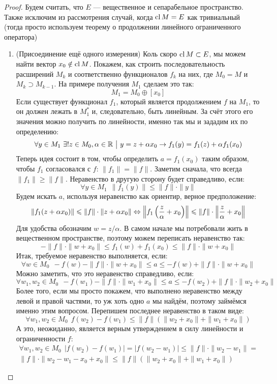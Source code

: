 \begin{proof}
	Будем считать, что $E$ --- вещественное и сепарабельное пространство. Также исключим из рассмотрения случай, когда $\operatorname{cl} M = E$ как тривиальный (тогда просто используем теорему о продолжении линейного ограниченного оператора)
	\begin{enumerate}
		\item (Присоединение ещё одного измерения) Коль скоро $\operatorname{cl} M \subset E$, мы можем найти вектор $x_0 \notin \operatorname{cl} M$. Покажем, как строить последовательность расширений $M_k$ и соответственно функционалов $f_k$ на них, где $M_0 = M$ и $M_k \supset M_{k - 1}$. На примере получения $M_1$ сделаем это так:
		\[
			M_1 = M_0 \oplus [x_0]
		\]
		Если существует функционал $f_1$, который является продолжением $f$ на $M_1$, то он должен лежать в $M_1^*$ и, следовательно, быть линейным. За счёт этого его значения можно получить по линейности, именно так мы и зададим их по определению:
		\[
			\forall y \in M_1\ \exists! z \in M_0, \alpha \in \mathbb{R} \ \big|\  y = z + \alpha x_0 \rightarrow f_1(y) = f_1(z) + \alpha f_1(x_0)
		\]
		Теперь идея состоит в том, чтобы определить $a = f_1(x_0)$ таким образом, чтобы $f_1$ согласовался с $f$: $\|f_1\| = \|f\|$. Заметим сначала, что всегда $\|f_1\| \ge \|f\|$. Неравенство в другую сторону будет справедливо, если:
		\[
			\forall y \in M_1\ \ \|f_1(y)\| \le \|f\| \cdot \|y\|
		\]
		Будем искать $a$, используя неравенство как ориентир, верное предположение:
		\[
			\|f_1(z + \alpha x_0)\| \leqslant \|f\| \cdot \|z + \alpha x_0\| \Leftrightarrow \left\|f_1\left(\frac{z}{\alpha} + x_0\right)\right\| \leqslant \|f\| \cdot \left\|\frac{z}{\alpha} + x_0\right\|
		\]
		Для удобства обозначим $w = z / \alpha$. В самом начале мы потребовали жить в вещественном пространстве, поэтому можем переписать неравенство так:
		\[
			-\|f\| \cdot \|w + x_0\| \le f_1(w) + f_1(x_0) \le \|f\| \cdot \|w + x_0\|
		\]
		Итак, требуемое неравенство выполняется, если:
		\[
			\forall w \in M_0\ \ -f(w) - \|f\| \cdot \|w + x_0\| \le a \le -f(w) + \|f\| \cdot \|w + x_0\|
		\]
		Можно заметить, что это неравенство справедливо, если:
		\[
			\forall w_1, w_2 \in M_0\ \ -f(w_1) - \|f\| \cdot \|w_1 + x_0\| \le a \le -f(w_2) + \|f\| \cdot \|w_2 + x_0\|
		\]
		Более того, если мы просто покажем, что выполнено неравенство между левой и правой частями, то уж хоть одно $a$ мы найдём, поэтому займёмся именно этим вопросом. Перепишем последнее неравенство в таком виде:
		\[
			\forall w_1, w_2 \in M_0\ \ f(w_2) - f(w_1) \le \|f\|(\|w_2 + x_0\| + \|w_1 + x_0\|)
		\]
		А это, неожиданно, является верным утверждением в силу линейности и ограниченности $f$:
		\begin{multline*}
			\forall w_1, w_2 \in M_0\ \ |f(w_2) - f(w_1)| = |f(w_2 - w_1)| \le \|f\| \cdot \|w_2 - w_1\| =
			\\
			\|f\| \cdot \|w_2 - w_1 - x_0 + x_0\| \le \|f\|(\|w_2 + x_0\| + \|w_1 + x_0\|)
		\end{multline*}
		

\end{enumerate}
\end{proof}
